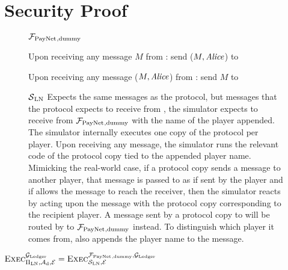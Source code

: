 \section{Security Proof}
  \begin{figure}[H]
    \begin{systembox}{$\mathcal{F}_{\mathrm{PayNet}}{}_{\mathrm{, dummy}}$}
      \begin{algorithmic}[1]
        \State Upon receiving any message $M$ from \alice:
        \Indent
            \State send ($M, \mathit{Alice}$) to \simulator
          \EndIf
        \EndIndent
        \Statex

        \State Upon receiving any message ($M, \mathit{Alice}$) from \simulator:
        \Indent
            \State send $M$ to \alice
          \EndIf
        \EndIndent
      \end{algorithmic}
    \end{systembox}
    \caption{}
    \label{alg:fpaynet:dummy}
  \end{figure}

  \begin{figure}[H]
    \begin{simulatorbox}{$\mathcal{S}{}_{\mathrm{LN}}$}
      Expects the same messages as the protocol, but messages that the protocol
      expects to receive from \environment, the simulator expects to receive
      from $\mathcal{F}_{\mathrm{PayNet}}{}_{\mathrm{, dummy}}$ with the name of the player appended.
      The simulator internally executes one copy of the protocol per player.
      Upon receiving any message, the simulator runs the relevant code of the
      protocol copy tied to the appended player name. Mimicking the real-world
      case, if a protocol copy sends a message to another player, that message
      is passed to \adversary{} as if sent by the player and if \adversary{}
      allows the message to reach the receiver, then the simulator reacts by
      acting upon the message with the protocol copy corresponding to the
      recipient player. A message sent by a protocol copy to \environment{} will
      be routed by \simulator{} to $\mathcal{F}_{\mathrm{PayNet}}{}_{\mathrm{, dummy}}$ instead. To
      distinguish which player it comes from, \simulator{} also appends the
      player name to the message.
    \end{simulatorbox}
    \caption{}
    \label{alg:sim:ln}
  \end{figure}

  \begin{lemma}
    \label{lemma:dummy}
    $\textsc{Exec}^{\mathcal{G}_{\mathrm{Ledger}}}_{\Pi_{\mathrm{LN}}, \mathcal{A}_{\mathrm{d}},
    \mathcal{E}} = \textsc{Exec}^{\mathcal{F}_{\mathrm{PayNet}}{}_{\mathrm{, dummy}},
    \mathcal{G}_{\mathrm{Ledger}}}_{\mathcal{S}_{\mathrm{LN}}, \mathcal{E}}$
  \end{lemma}

